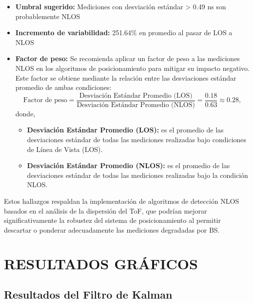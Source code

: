 \begin{itemize}
\item \textbf{Umbral sugerido:} Mediciones con desviación estándar > 0.49 ns son probablemente NLOS
\item \textbf{Incremento de variabilidad:} 251.64\% en promedio al pasar de LOS a NLOS
\item \textbf{Factor de peso:} Se recomienda aplicar un factor de peso a las mediciones NLOS en los algoritmos de posicionamiento para mitigar su impacto negativo. Este factor se obtiene mediante la relación entre las desviaciones estándar promedio de ambas condiciones:
%
\begin{equation}
    \text{Factor de peso} = \frac{\text{Desviación Estándar Promedio (LOS)}}{\text{Desviación Estándar Promedio (NLOS)}} = \frac{0.18}{0.63} \approx 0.28,
\end{equation}
%
donde,
\begin{itemize}
    \item \textbf{Desviación Estándar Promedio (LOS):} es el promedio de las desviaciones estándar de todas las mediciones realizadas bajo condiciones de Línea de Vista (LOS).
    \item \textbf{Desviación Estándar Promedio (NLOS):} es el promedio de las desviaciones estándar de todas las mediciones realizadas bajo la condición NLOS.
\end{itemize}
\end{itemize}
Estos hallazgos respaldan la implementación de algoritmos de detección NLOS basados en el análisis de la dispersión del ToF, que podrían mejorar significativamente la robustez del sistema de posicionamiento al permitir descartar o ponderar adecuadamente las mediciones degradadas por BS.


\section{RESULTADOS GRÁFICOS}
\label{sec:resultados_graficos_2d}

\subsection{Resultados del Filtro de Kalman}

